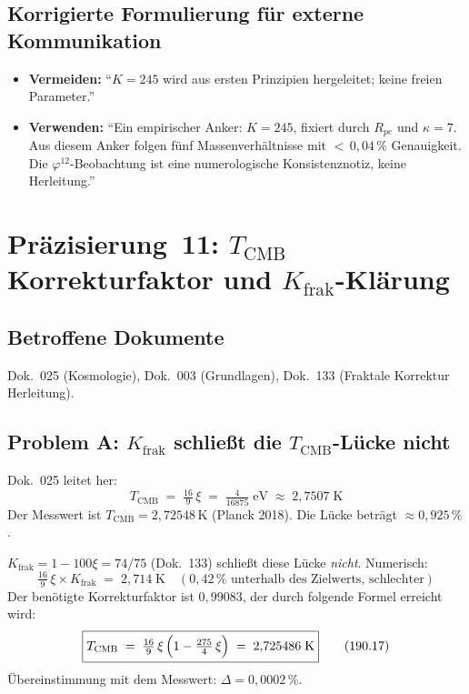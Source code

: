 \subsection*{Korrigierte Formulierung für externe Kommunikation}

\begin{itemize}
  \item \textbf{Vermeiden:} \enquote{$K = 245$ wird aus ersten Prinzipien
        hergeleitet; keine freien Parameter.}
  \item \textbf{Verwenden:} \enquote{Ein empirischer Anker: $K = 245$,
        fixiert durch $R_{pe}$ und $\kappa = 7$. Aus diesem Anker
        folgen fünf Massenverhältnisse mit ${<}\,0{,}04\,\%$ Genauigkeit.
        Die $\varphi^{12}$-Beobachtung ist eine numerologische
        Konsistenznotiz, keine Herleitung.}
\end{itemize}

\section{\texorpdfstring{Präzisierung~11: $T_\text{CMB}$ Korrekturfaktor und $K_\text{frak}$-Klärung}{Präzisierung 11: T\_CMB Korrekturfaktor und K\_frak-Klärung}}

\subsection*{Betroffene Dokumente}

Dok.~025 (Kosmologie), Dok.~003 (Grundlagen), Dok.~133 (Fraktale Korrektur Herleitung).

\subsection*{Problem A: $K_\text{frak}$ schließt die $T_\text{CMB}$-Lücke nicht}

Dok.~025 leitet her:
\begin{equation}
  T_\text{CMB} \;=\; \tfrac{16}{9}\,\xi \;=\; \tfrac{4}{16875}\;\text{eV}
  \;\approx\; 2{,}7507\;\text{K}
  \tag{190.15}
\end{equation}
Der Messwert ist $T_\text{CMB} = 2{,}72548\,\text{K}$ (Planck 2018).
Die Lücke beträgt $\approx 0{,}925\,\%$.

$K_\text{frak} = 1 - 100\xi = 74/75$ (Dok.~133) schließt diese
Lücke \emph{nicht}. Numerisch:
\begin{equation}
  \tfrac{16}{9}\,\xi \times K_\text{frak} \;=\; 2{,}714\;\text{K}
  \quad (0{,}42\,\% \text{ unterhalb des Zielwerts, schlechter})
  \tag{190.16}
\end{equation}
Der benötigte Korrekturfaktor ist $0{,}99083$, der durch folgende
Formel erreicht wird:
\begin{equation}
  \boxed{
    T_\text{CMB} \;=\; \tfrac{16}{9}\,\xi\,\Bigl(1 - \tfrac{275}{4}\,\xi\Bigr)
    \;=\; 2{,}725486\;\text{K}
  }
  \tag{190.17}
\end{equation}
Übereinstimmung mit dem Messwert: $\Delta = 0{,}0002\,\%$.

